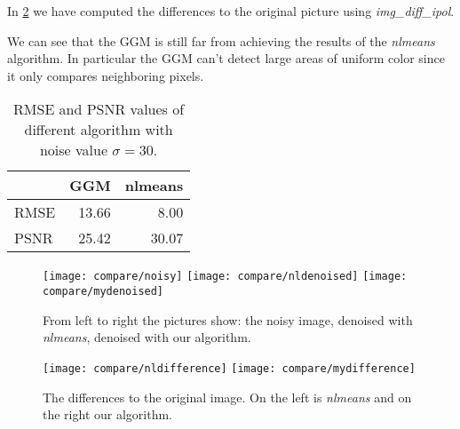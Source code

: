 \documentclass[12pt]{scrartcl}
\begin{document}
In \cref{fig:diff} we have computed the differences to the original picture using \emph{img\_diff\_ipol}.

We can see that the GGM is still far from achieving the results of the \emph{nlmeans} algorithm. In particular the GGM can't detect large areas of uniform color since it only compares neighboring pixels.

\begin{table}
  \centering
  \caption{RMSE and PSNR values of different algorithm with noise value $\sigma=30$.}
  \begin{tabular}{l | r | r}
          & GGM   & nlmeans \\
    \hline
    RMSE  & 13.66 & 8.00    \\
    PSNR  & 25.42 & 30.07
  \end{tabular}
  \label{tab:rmse}
\end{table}

\begin{figure}
  \centering
  \texttt{[image: compare/noisy]}
  \texttt{[image: compare/nldenoised]}
  \texttt{[image: compare/mydenoised]}
  \label{fig:den}
  \caption{From left to right the pictures show: the noisy image, denoised with \emph{nlmeans}, denoised with our algorithm.}
\end{figure}

\begin{figure}
  \centering
  \texttt{[image: compare/nldifference]}
  \texttt{[image: compare/mydifference]}
  \label{fig:diff}
  \caption{The differences to the original image. On the left is \emph{nlmeans} and on the right our algorithm.}
\end{figure}



\clearpage

\end{document}
